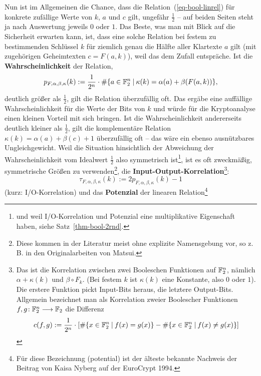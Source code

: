 \begin{refsegment}
Nun ist im Allgemeinen die Chance, dass die Relation~(\ref{eq-bool-linrel})
für konkrete zufällige Werte von $k$, $a$ und $c$ gilt, ungefähr
$\frac{1}{2}$ -- auf beiden Seiten steht ja nach Auswertung jeweils
$0$ oder $1$. Das Beste, was man mit Blick auf die Sicherheit
erwarten kann, ist, dass eine solche Relation bei festem zu
bestimmenden Schlüssel $k$ für ziemlich genau die Hälfte aller
Klartexte $a$ gilt (mit zugehörigen Geheimtexten $c = F(a,k)$),
weil das dem Zufall entspräche. Ist die \textbf{Wahrscheinlichkeit}
der Relation,
\[
   p_{F,\alpha,\beta,\kappa}(k) := \frac{1}{2^n} \cdot
      \#\{a \in \mathbb{F}_2^n \:|\:
           \kappa(k) = \alpha(a) + \beta(F(a,k)) \},
\]
deutlich größer als $\frac{1}{2}$, gilt die Relation überzufällig oft.
Das ergäbe eine auffällige Wahrscheinlichkeit für die Werte der
Bits von $k$ und würde für die Kryptoanalyse einen kleinen Vorteil
mit sich bringen. Ist die Wahrscheinlichkeit andererseits deutlich
kleiner als $\frac{1}{2}$, gilt die komplementäre Relation
$\kappa(k) = \alpha(a) + \beta(c) + 1$ überzufällig oft -- das wäre
ein ebenso ausnützbares Ungleichgewicht.
Weil die Situation hinsichtlich der Abweichung der Wahrscheinlichkeit
vom Idealwert $\frac{1}{2}$ also symmetrisch ist\footnote{%
   und weil I/O-Korrelation und
   Potenzial eine multiplikative Eigenschaft haben,
   siehe Satz~\ref{thm-bool-2rnd}.
}, ist es oft zweckmäßig, symmetrische Größen zu verwenden\footnote{%
   Diese kommen in der Literatur meist ohne explizite Namensgebung vor,
   so z.\,B. in den Originalarbeiten von Matsui.
},
die \textbf{Input-Output-Korrelation}\footnote{%
   Das ist die Korrelation zwischen zwei Booleschen Funktionen auf
   $\mathbb{F}_2^n$, nämlich $\alpha + \kappa(k)$ und $\beta \circ F_k$.
   (Bei festem $k$ ist $\kappa(k)$ eine Konstante, also $0$ oder $1$).
   Die erstere Funktion pickt Input-Bits heraus, die letztere Output-Bits.
   Allgemein bezeichnet man als Korrelation zweier Boolescher Funktionen
   $f, g\!:\mathbb{F}_2^n \longrightarrow \mathbb{F}_2$ die Differenz
\[
     c(f,g) := \frac{1}{2^n} \cdot \left[ \#\{x \in \mathbb{F}_2^n \:|\: f(x) = g(x)\}
                          - \#\{x \in \mathbb{F}_2^n \:|\: f(x) \neq g(x)\} \right]
\]
}:
\[
   \tau_{F,\alpha,\beta,\kappa}(k) := 2 p_{F,\alpha,\beta,\kappa}(k) - 1
\]
(kurz: I/O-Korrelation) und das
\textbf{Potenzial}
der linearen Relation\footnote{%
   Für diese Bezeichnung (\glqq potential\grqq) ist der älteste bekannte
   Nachweis der Beitrag von Kaisa Nyberg auf der {\sc EuroCrypt} 1994.
}
\end{refsegment}
